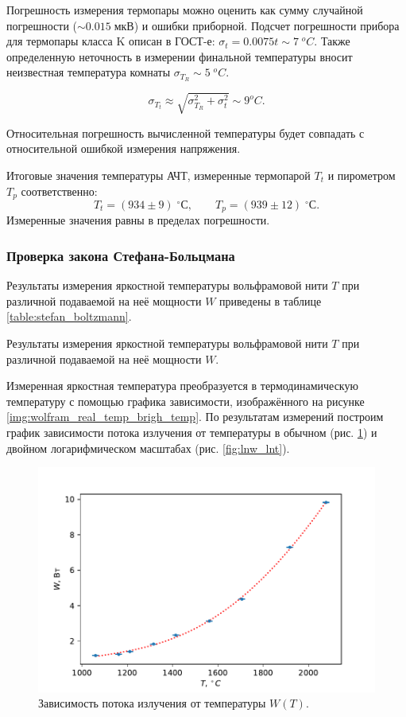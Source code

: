 \documentclass[10pt,a4paper]{article}
\newcommand{\cels}{\; ^\circ С}
\begin{document}
\begin{multicols}{2}
	Погрешность измерения термопары можно оценить как сумму случайной погрешности ($\sim0.015\;\text{мкВ}$) и ошибки приборной. Подсчет погрешности прибора для термопары класса K описан в ГОСТ-е: $\sigma_t = 0.0075t \sim 7\; ^oC$. Также определенную неточность в измерении финальной температуры вносит неизвестная температура комнаты $\sigma_{T_R} \sim 5\; ^oC$.
	
	$$\sigma_{T_t} \approx \sqrt{\sigma_{T_R}^2 + \sigma_t^2} \sim 9 ^oC.$$
	
	Относительная погрешность вычисленной температуры будет совпадать с относительной ошибкой измерения напряжения. 
	
	Итоговые значения температуры АЧТ, измеренные термопарой $T_t$ и пирометром $T_p$ соответственно:
	$$
	T_t = (934 \pm 9) \cels,\qquad T_p = (939 \pm 12) \cels.
	$$	
	Измеренные значения равны в пределах погрешности.
	
	\subsubsection*{Проверка закона Стефана-Больцмана}
	
	Результаты измерения яркостной температуры вольфрамовой нити $T$ при различной подаваемой на неё мощности $W$ приведены в таблице \ref{table:stefan_boltzmann}.
	
	\begin{table}[H]
		\addtolength{\tabcolsep}{-4pt}
		\footnotesize
		
		\caption{Результаты измерения яркостной температуры вольфрамовой нити $T$ при различной подаваемой на неё мощности $W$.}
		\label{table:stefan_boltzmann}
	\end{table}
	
	Измеренная яркостная температура преобразуется в термодинамическую температуру с помощью графика зависимости, изображённого на рисунке \ref{img:wolfram_real_temp_brigh_temp}. По результатам измерений построим график зависимости потока излучения от температуры в обычном (рис. \ref{fig:wt}) и двойном логарифмическом масштабах (рис. \ref{fig:lnw_lnt}).
	
	\begin{figure}[H]
		\includegraphics[width=1\textwidth]{gen/fig-wt.pdf}
		\caption{Зависимость потока излучения от температуры $W(T)$.}
		\label{fig:wt}
	\end{figure}


\end{multicols}
\end{document}
